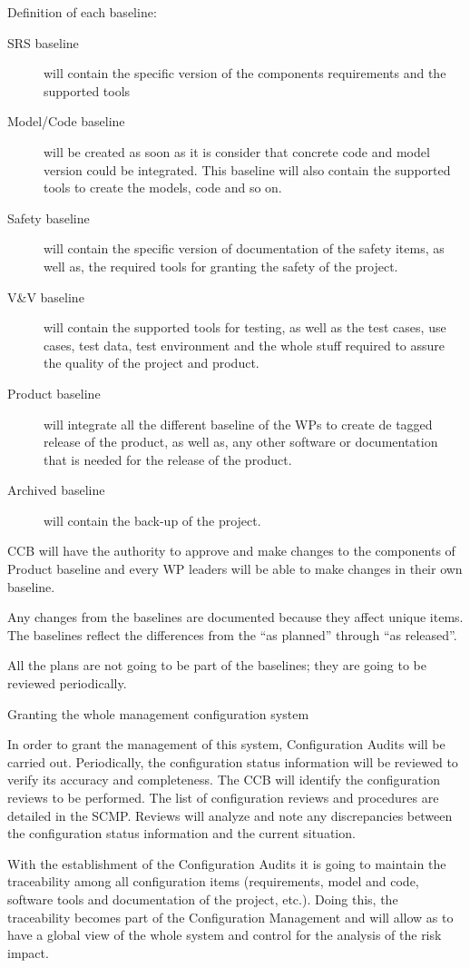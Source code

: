 \documentclass{template/openetcs_article}
\begin{document}
Definition of each baseline:
\begin{description}
\item[SRS baseline] will contain the specific version of the components requirements and the supported tools
\item[Model/Code baseline] will be created as soon as it is consider that concrete code and model version could be integrated. This baseline will also contain the supported tools to create the models, code and so on.
\item[Safety baseline] will contain the specific version of documentation of the safety items, as well as, the required tools for granting the safety of the project. 
\item[V\&V baseline] will contain the supported tools for testing, as well as the test cases, use cases, test data, test environment and the whole stuff required to assure the quality of the project and product.
\item[Product baseline] will integrate all the different baseline of the WPs to create de tagged release of the product, as well as, any other software or documentation that is needed for the release of the product.
\item[Archived baseline] will contain the back-up of the project. 
\end{description}

CCB will have the authority to approve and make changes to the components of Product baseline and every WP leaders will be able to make changes in their own baseline.

Any changes from the baselines are documented because they affect unique items. The baselines reflect the differences from the ``as planned'' through ``as released''.

All the plans are not going to be part of the baselines; they are going to be reviewed periodically.

Granting the whole management configuration system

In order to grant the management of this system, Configuration Audits will be carried out. Periodically, the configuration status information will be reviewed to verify its accuracy and completeness.  The CCB will identify the configuration reviews to be performed. The list of configuration reviews and procedures are detailed in the SCMP. Reviews will analyze and note any discrepancies between the configuration status information and the current situation.

With the establishment of the Configuration Audits it is going to maintain the traceability among all configuration items (requirements, model and code, software tools and documentation of the project, etc.). Doing this, the traceability becomes part of the Configuration Management and will allow as to have a global view of the whole system and control for the analysis of the risk impact.
\end{document}
